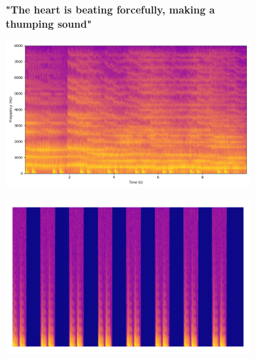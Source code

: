 \begin{figure}[htbp]
    \centering
     \begin{subfigure}[b]{0.18\textwidth}
        \centering
        \scriptsize\textbf{"The heart is beating forcefully, making a thumping sound"}
        \vspace{5.0mm}
    \end{subfigure}
    \begin{subfigure}[b]{0.18\textwidth}
        \centering
        \includegraphics[width=\textwidth]{plots/onepeace_best_sdr/onepeace mixture_spectrogram.png}
    \end{subfigure}
     \begin{subfigure}[b]{0.18\textwidth}
        \centering
        \includegraphics[width=\textwidth]{plots/onepeace_best_sdr/onepeace target_spectrogram.png}
    \end{subfigure}
    \begin{subfigure}[b]{0.18\textwidth}

\end{subfigure}
\end{figure}
